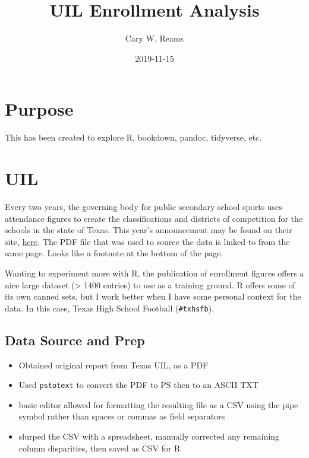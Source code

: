 \documentclass[]{book}
\title{UIL Enrollment Analysis}
\author{Cary W. Reams}
\date{2019-11-15}
\providecommand{\tightlist}{%
  \setlength{\itemsep}{0pt}\setlength{\parskip}{0pt}}
\begin{document}
\maketitle

{
\setcounter{tocdepth}{1}
\tableofcontents
}
\chapter{Purpose}\label{purpose}

This has been created to explore R, bookdown, pandoc, tidyverse, etc.

\chapter{UIL}\label{uil}

Every two years, the governing body for public secondary school sports
uses attendance figures to create the classifications and districts of
competition for the schools in the state of Texas. This year's
announcement may be found on their site,
\href{http://www.uiltexas.org/athletics/conference-cutoffs}{here}. The
PDF file that was used to source the data is linked to from the same
page. Looks like a footnote at the bottom of the page.

Wanting to experiment more with R, the publication of enrollment figures
offers a nice large dataset (\textgreater{} 1400 entries) to use as a
training ground. R offers some of its own canned sets, but I work better
when I have some personal context for the data. In this case, Texas High
School Football (\texttt{\#txhsfb}).

\section{Data Source and Prep}\label{data-source-and-prep}

\begin{itemize}
\tightlist
\item
  Obtained original report from Texas UIL, as a PDF
\item
  Used \texttt{pstotext} to convert the PDF to PS then to an ASCII TXT
\item
  basic editor allowed for formatting the resulting file as a CSV using
  the pipe symbol rather than spaces or commas as field separators
\item
  slurped the CSV with a spreadsheet, manually corrected any remaining
  column disparities, then saved as CSV for R
\end{itemize}
\end{document}
